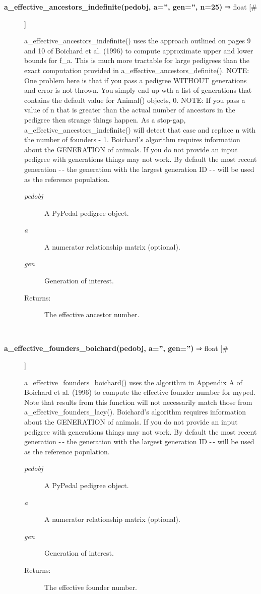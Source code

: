 \documentclass{article}
\begin{document}
\begin{description}
\item[\textbf{a\_effective\_ancestors\_indefinite(pedobj, a='', gen='', n=25)} ⇒ float [\#]
]
\par a\_effective\_ancestors\_indefinite() uses the approach outlined on pages 9 and 10 of
Boichard et al. (1996) to compute approximate upper and lower bounds for f\_a.  This
is much more tractable for large pedigrees than the exact computation provided in
a\_effective\_ancestors\_definite().
NOTE: One problem here is that if you pass a pedigree WITHOUT generations and error
is not thrown.  You simply end up wth a list of generations that contains the default
value for Animal() objects, 0.
NOTE: If you pass a value of n that is greater than the actual number of ancestors in
the pedigree then strange things happen.  As a stop-gap, a\_effective\_ancestors\_indefinite()
will detect that case and replace n with the number of founders - 1.
Boichard's algorithm requires information about the GENERATION of animals.  If you
do not provide an input pedigree with generations things may not work.  By default
the most recent generation -$\,$- the generation with the largest generation ID -$\,$- will
be used as the reference population.
\begin{description}
\item[\textit{pedobj}
]
A PyPedal pedigree object.
\item[\textit{a}
]
A numerator relationship matrix (optional).
\item[\textit{gen}
]
Generation of interest.
\item[Returns:
]
The effective ancestor number.
\end{description}\\

\item[\textbf{a\_effective\_founders\_boichard(pedobj, a='', gen='')} ⇒ float [\#]
]
\par a\_effective\_founders\_boichard() uses the algorithm in Appendix A of Boichard et al.
(1996) to compute the effective founder number for myped.  Note that results from
this function will not necessarily match those from a\_effective\_founders\_lacy().
Boichard's algorithm requires information about the GENERATION of animals.  If you
do not provide an input pedigree with generations things may not work.  By default
the most recent generation -$\,$- the generation with the largest generation ID -$\,$- will
be used as the reference population.
\begin{description}
\item[\textit{pedobj}
]
A PyPedal pedigree object.
\item[\textit{a}
]
A numerator relationship matrix (optional).
\item[\textit{gen}
]
Generation of interest.
\item[Returns:
]
The effective founder number.
\end{description}\\


\end{description}
\end{document}
